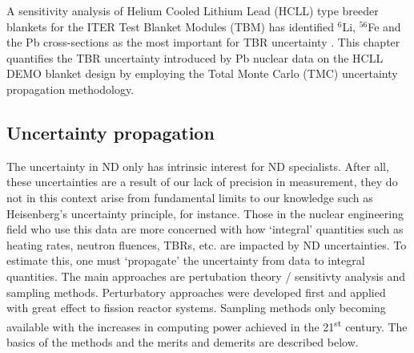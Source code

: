 A sensitivity analysis of Helium Cooled Lithium Lead (HCLL)  type breeder blankets for the ITER Test Blanket Modules (TBM)  has identified $^{6}$Li, $^{56}$Fe and the Pb cross-sections as the most important for TBR uncertainty \cite{Leichtle2011}. This chapter quantifies the TBR uncertainty introduced by Pb nuclear data on the HCLL DEMO blanket design by employing the Total Monte Carlo (TMC) uncertainty propagation methodology.




\subsection{Uncertainty propagation}
The uncertainty in ND only has intrinsic interest for ND specialists. After all, these uncertainties are a result of our lack of precision in measurement, they do not in this context arise from fundamental limits to our knowledge such as Heisenberg's uncertainty principle, for instance. Those in the nuclear engineering field who use this data are more concerned with how `integral' quantities such as heating rates, neutron fluences, TBRs, etc. are impacted by ND uncertainties. To estimate this, one must `propagate' the uncertainty from data to integral quantities. The main approaches are pertubation theory / sensitivty analysis and sampling methods. Perturbatory approaches were developed first and applied with great effect to fission reactor systems. Sampling methods only becoming available with the increases in computing power achieved in the 21\textsuperscript{st} century. The basics of the methods and the merits and demerits are described below.

